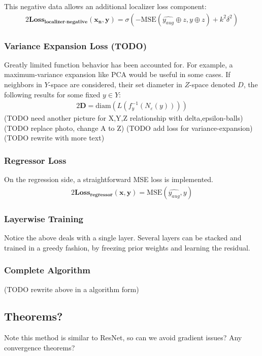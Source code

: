 \documentclass[12pt]{iopart}
\theoremstyle{break}
\begin{document}
This negative data allows an additional localizer loss component:
\begin{alignat}{2}
\mathbf{\text{Loss}_\text{localizer-negative}(x_n,y)} = \sigma( - \text{MSE}(\hat{y_{aug}} \oplus z,y \oplus z) + k^2 \delta^2)
\end{alignat}
	
\subsubsection{Variance Expansion Loss (TODO)}
Greatly limited function behavior has been accounted for. For example, a maximum-variance expansion like PCA would be useful in some cases.
If neighbors in $Y$-space are considered, their set diameter in $Z$-space denoted $D$, the following results for some fixed $y \in Y$:
\begin{alignat}{2}
\mathbf{D} = \text{diam} (L(f^{-1}_y(N_\varepsilon(y))))
\end{alignat}
(TODO need another picture for X,Y,Z relationship with delta,epsilon-balls)
(TODO replace photo, change A to Z)
(TODO add loss for variance-expansion)
(TODO rewrite with more text)
	
\subsubsection{Regressor Loss}
On the regression side, a straightforward MSE loss is implemented.
\begin{alignat}{2}
\mathbf{\text{Loss}_\text{regressor}(x,y)} = \text{MSE}(\hat{y_{aug}},y)
\end{alignat}
	
\subsubsection{Layerwise Training}
Notice the above deals with a single layer. Several layers can be stacked and trained in a greedy fashion, by freezing prior weights and learning the residual.
	
\subsubsection{Complete Algorithm}
(TODO rewrite above in a algorithm form)
	
\subsection{Theorems?}
Note this method is similar to ResNet, so can we avoid gradient issues?
Any convergence theorems?
\end{document}
